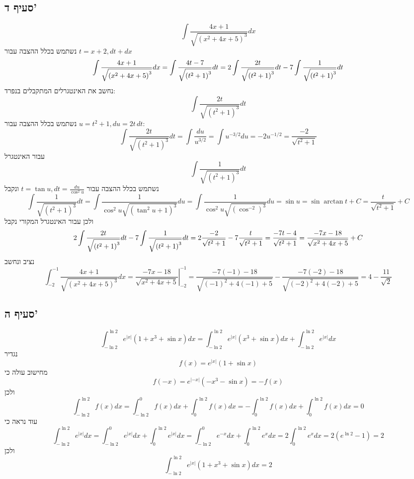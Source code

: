 \subsection{סעיף ד'}
\[
	\int \frac{4x + 1}{\sqrt{{(x^2 + 4x + 5)}^3}} dx
\]
נשתמש בכלל ההצבה עבור $t = x + 2, dt + dx$
\[
	\int \frac{4x + 1}{\sqrt{{(x^2 + 4x + 5)}^3}} dx
	= \int \frac{4t - 7}{\sqrt{{(t^2 + 1)}^3}} dt \\
	= 2\int \frac{2t}{\sqrt{{(t^2 + 1)}^3}} dt - 7\int \frac{1}{\sqrt{{(t^2 + 1)}^3}} dt \\
\]
נחשב את האינטגרלים המתקבלים בנפרד:
\[
	\int \frac{2t}{\sqrt{{(t^2 + 1)}^3}} dt
\]
נשתמש בכלל ההצבה עבור $u = t^2 + 1, du = 2t \, dt$:
\[
	\int \frac{2t}{\sqrt{{(t^2 + 1)}^3}} dt
	= \int \frac{du}{u^{3/2}}
	= \int u^{-3/2} du
	= -2 u^{-1/2}
	= \frac{-2}{\sqrt{t^2 + 1}}
\]
עבור האינטגרל
\[
	\int \frac{1}{\sqrt{{(t^2 + 1)}^3}} dt
\]
נשתמש בכלל ההצבה עבור $t = \tan u, dt = \frac{du}{\cos^2 u}$ ונקבל
\[
	\int \frac{1}{\sqrt{{(t^2 + 1)}^3}} dt
	= \int \frac{1}{\cos^2 u \sqrt{{(\tan^2 u + 1)}^3}} du
	= \int \frac{1}{\cos^2 u \sqrt{{(\cos^{-2})}^3}} du
	= \sin u = \sin \arctan t + C
	= \frac{t}{\sqrt{t^2 + 1}} + C
\]
ולכן עבור האינטגרל המקורי נקבל
\[
	2\int \frac{2t}{\sqrt{{(t^2 + 1)}^3}} dt - 7\int \frac{1}{\sqrt{{(t^2 + 1)}^3}} dt \\
	= 2 \frac{-2}{\sqrt{t^2 + 1}} - 7 \frac{t}{\sqrt{t^2 + 1}}
	= \frac{-7t - 4}{\sqrt{t^2 + 1}}
	= \frac{-7x - 18}{\sqrt{x^2 + 4x + 5}} + C
\]
נציב ונחשב
\[
	\int_{-2}^{-1} \frac{4x + 1}{\sqrt{{(x^2 + 4x + 5)}^3}} dx
	= \left. \frac{-7x - 18}{\sqrt{x^2 + 4x + 5}} \right|_{-2}^{-1}
	= \frac{-7(-1) - 18}{\sqrt{{(-1)}^2 + 4 (-1) + 5}} - \frac{-7(-2) - 18}{\sqrt{{(-2)}^2 + 4 (-2) + 5}}
	= 4 - \frac{11}{\sqrt{2}}
\]

\subsection{סעיף ה'}
\[
	\int_{-\ln 2}^{\ln 2} e^{|x|} (1 + x^3 + \sin x) dx
	= \int_{-\ln 2}^{\ln 2} e^{|x|} (x^3 + \sin x) dx
	+ \int_{-\ln 2}^{\ln 2} e^{|x|} dx
\]
נגדיר
\[
	f(x) = e^{|x|} (1 + \sin x)
\]
מחישוב עולה כי
\[
	f(-x) = e^{|-x|} (-x^3 - \sin x) = - f(x)
\]
ולכן
\[
	\int_{-\ln 2}^{\ln 2} f(x) dx
	= \int_{-\ln 2}^{0} f(x) dx + \int_{0}^{\ln 2} f(x) dx
	= -\int_{0}^{\ln 2} f(x) dx + \int_{0}^{\ln 2} f(x) dx
	= 0
\]
עוד נראה כי
\[
	\int_{-\ln 2}^{\ln 2} e^{|x|} dx
	= \int_{-\ln 2}^{0} e^{|x|} dx + \int_{0}^{\ln 2} e^{|x|} dx
	= \int_{-\ln 2}^{0} e^{-x} dx + \int_{0}^{\ln 2} e^{x} dx
	= 2\int_{0}^{\ln 2} e^{x} dx
	= 2 (e^{\ln 2} - 1) = 2
\]
ולכן
\[
	\int_{-\ln 2}^{\ln 2} e^{|x|} (1 + x^3 + \sin x) dx = 2
\]

